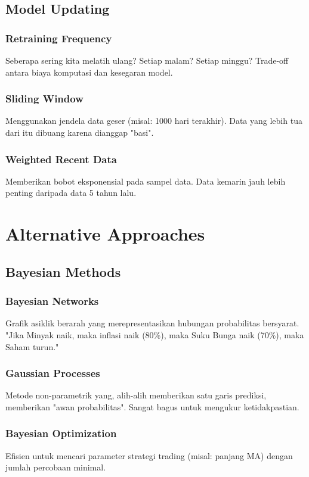 \documentclass[12pt,a4paper]{book}
\begin{document}
\section{Model Updating}
\subsection{Retraining Frequency}
Seberapa sering kita melatih ulang? Setiap malam? Setiap minggu? Trade-off antara biaya komputasi dan kesegaran model.

\subsection{Sliding Window}
Menggunakan jendela data geser (misal: 1000 hari terakhir). Data yang lebih tua dari itu dibuang karena dianggap "basi".

\subsection{Weighted Recent Data}
Memberikan bobot eksponensial pada sampel data. Data kemarin jauh lebih penting daripada data 5 tahun lalu.

\chapter{Alternative Approaches}
\section{Bayesian Methods}
\subsection{Bayesian Networks}
Grafik asiklik berarah yang merepresentasikan hubungan probabilitas bersyarat. "Jika Minyak naik, maka inflasi naik (80\%), maka Suku Bunga naik (70\%), maka Saham turun."

\subsection{Gaussian Processes}
Metode non-parametrik yang, alih-alih memberikan satu garis prediksi, memberikan "awan probabilitas". Sangat bagus untuk mengukur ketidakpastian.

\subsection{Bayesian Optimization}
Efisien untuk mencari parameter strategi trading (misal: panjang MA) dengan jumlah percobaan minimal.
\end{document}
